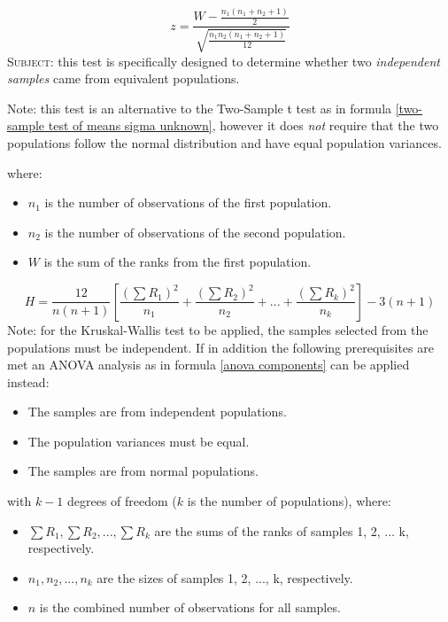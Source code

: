 \begin{equation}
\label{wilcoxon rank sum test}
z = \frac{W - \frac{n_1(n_1 + n_2 + 1)}{2}}{\sqrt{\frac{n_1n_2(n_1 + n_2 + 1)}{12}}}
\end{equation}
\textsc{Subject:} this test is specifically designed to determine whether two \emph{independent samples} came 
from equivalent populations.

Note: this test is an alternative to the Two-Sample t test as in formula \eqref{two-sample test of means sigma unknown}, however it does \textit{not} require that the two populations follow the normal distribution and have equal population variances.

where:
\begin{itemize}
 \item $n_1$ is the number of observations of the first population.
 \item $n_2$ is the number of observations of the second population.
 \item $W$ is the sum of the ranks from the first population.
\end{itemize}
\hformbar


\begin{equation}
\label{kruskal wallis test}
H = \frac{12}{n(n + 1)}\left[\frac{(\sum R_1)^2}{n_1} + \frac{(\sum R_2)^2}{n_2} + ... + \frac{(\sum R_k)^2}{n_k}\right] - 3(n+1) 
\end{equation}
Note: for the Kruskal-Wallis test to be applied, the samples selected from the populations must be independent. If in addition the following prerequisites are met an ANOVA analysis as in formula \eqref{anova components} can be applied instead:
\begin{itemize}
 \item The samples are from independent populations.
 \item The population variances must be equal.
 \item The samples are from normal populations.
\end{itemize}

with $k-1$ degrees of freedom ($k$ is the number of populations), where:
\begin{itemize}
 \item $\sum R_1, \sum R_2, ..., \sum R_k$ are the sums of the ranks of samples 1, 2, ... k, respectively.
 \item $n_1, n_2, ..., n_k$ are the sizes of samples 1, 2, ..., k, respectively.
 \item $n$ is the combined number of observations for all samples.
\end{itemize}
\hformbar


